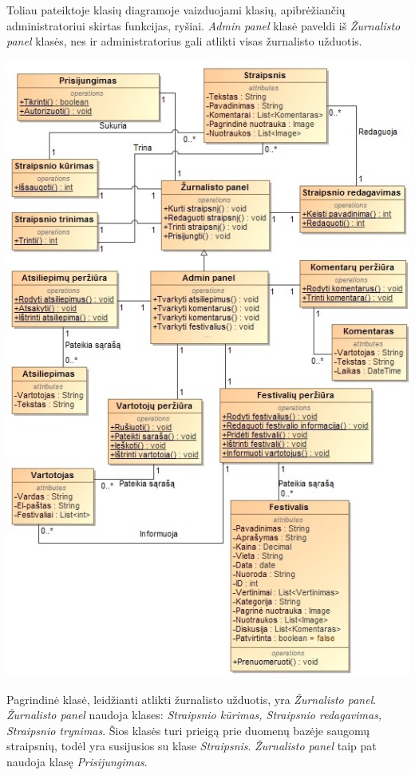 ﻿\documentclass{VUMIFPSkursinis}
\begin{document}
Toliau pateiktoje klasių diagramoje vaizduojami klasių, apibrėžiančių administratoriui skirtas funkcijas, ryšiai. \textit{Admin panel} klasė paveldi iš \textit{Žurnalisto panel} klasės, nes ir administratorius gali atlikti visas žurnalisto užduotis.
\begin{center}
    \includegraphics[scale=0.5]{img/PSI3/admin}
\end{center}
Pagrindinė klasė, leidžianti atlikti žurnalisto užduotis, yra \textit{Žurnalisto panel}. \textit{Žurnalisto panel} naudoja klases: \textit{Straipsnio kūrimas, Straipsnio redagavimas, Straipsnio trynimas}. Šios klasės turi prieigą prie duomenų bazėje saugomų straipsnių, todėl yra susijusios su klase \textit{Straipsnis}. \textit{Žurnalisto panel} taip pat naudoja klasę \textit{Prisijungimas}.
\end{document}
